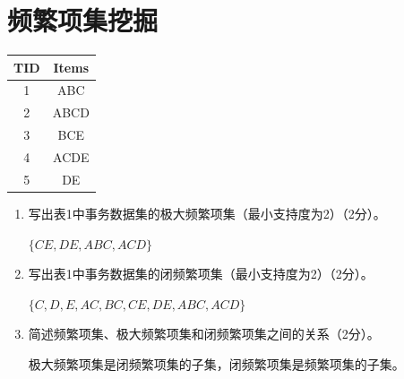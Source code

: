 \documentclass[12pt, UTF8]{article}
\begin{document}
\section{频繁项集挖掘}

\begin{table}[htbp]
\begin{center}
  \begin{tabular}{|c|c|}
    \hline
    TID & Items \\ \hline
    1   & ABC   \\ \hline
    2   & ABCD  \\ \hline
    3   & BCE   \\ \hline
    4   & ACDE  \\ \hline
    5   & DE    \\ \hline
  \end{tabular}
\end{center}
\end{table}

\begin{enumerate}
  \item 写出表1中事务数据集的极大频繁项集（最小支持度为2）（2分）。
  
  $\{CE, DE, ABC, ACD\}$
  \item 写出表1中事务数据集的闭频繁项集（最小支持度为2）（2分）。
  
  $\{C, D, E, AC, BC, CE, DE, ABC, ACD\}$
  \item 简述频繁项集、极大频繁项集和闭频繁项集之间的关系（2分）。
  
  极大频繁项集是闭频繁项集的子集，闭频繁项集是频繁项集的子集。
\end{enumerate}
\end{document}
